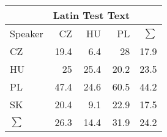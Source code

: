 \begin{tabular}{l|rrr|r}
\hline
 & \multicolumn{3}{c}{Latin Test Text} & \\
\hline
 Speaker   &   CZ &   HU &   PL &   $\sum$ \\
\hline
 CZ        & 19.4 &  6.4 & 28   &     17.9 \\
 HU        & 25   & 25.4 & 20.2 &     23.5 \\
 PL        & 47.4 & 24.6 & 60.5 &     44.2 \\
 SK        & 20.4 &  9.1 & 22.9 &     17.5 \\
\hline
 $\sum$   & 26.3 & 14.4 & 31.9 &     24.2 \\
\hline
\end{tabular}